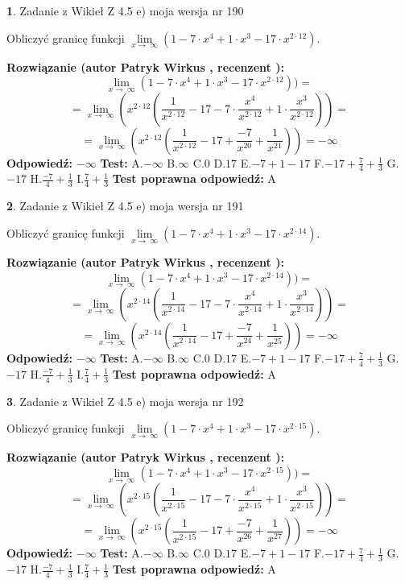 \documentclass[12pt, a4paper]{article}
\theoremstyle{definition} %
\newtheorem{zad}{}
\newcommand{\zadStart}[1]{\begin{zad}#1\newline}
\newcommand{\zadStop}{\end{zad}}
\newcommand{\rozwStart}[2]{\noindent \textbf{Rozwiązanie (autor #1 , recenzent #2): }\newline}
\newcommand{\rozwStop}{\newline}
\newcommand{\odpStart}{\noindent \textbf{Odpowiedź:}\newline}
\newcommand{\odpStop}{\newline}
\newcommand{\testStart}{\noindent \textbf{Test:}\newline}
\newcommand{\testStop}{\newline}
\newcommand{\kluczStart}{\noindent \textbf{Test poprawna odpowiedź:}\newline}
\newcommand{\kluczStop}{\newline}
\begin{document}
\zadStart{Zadanie z Wikieł Z 4.5 e) moja wersja nr 190}



Obliczyć granicę funkcji  $\lim\limits_{x\to\ \infty}(1 - 7 \cdot x^{4}+1 \cdot x^{3}- 17 \cdot x^{2\cdot12})$.
\zadStop
\rozwStart{Patryk Wirkus}{}
$$\lim\limits_{x\to\ \infty}(1 - 7 \cdot x^{4}+1 \cdot x^{3}- 17 \cdot x^{2\cdot12}))=$$
$$=\lim\limits_{x\to\ \infty}(x^{2\cdot12}(\frac{1}{x^{2\cdot12}}-17 -7 \cdot \frac{x^{4}}{x^{2\cdot12}}+1 \cdot \frac{x^{3}}{x^{2\cdot12}}))=$$
$$=\lim\limits_{x\to\ \infty}(x^{2\cdot12}(\frac{1}{x^{2\cdot12}}-17 + \frac{-7}{x^{20}}+ \frac{1}{x^{21}}))=-\infty$$
\rozwStop
\odpStart
$-\infty$
\odpStop
\testStart
A.$-\infty$ B.$\infty$ C.$0$ D.$17$ E.$-7 + 1 - 17$
F.$-17+\frac{7}{4}+\frac{1}{3}$ G.$-17$
H.$\frac{-7}{4}+\frac{1}{3}$
I.$\frac{7}{4}+\frac{1}{3}$
\testStop
\kluczStart
A
\kluczStop



\zadStart{Zadanie z Wikieł Z 4.5 e) moja wersja nr 191}



Obliczyć granicę funkcji  $\lim\limits_{x\to\ \infty}(1 - 7 \cdot x^{4}+1 \cdot x^{3}- 17 \cdot x^{2\cdot14})$.
\zadStop
\rozwStart{Patryk Wirkus}{}
$$\lim\limits_{x\to\ \infty}(1 - 7 \cdot x^{4}+1 \cdot x^{3}- 17 \cdot x^{2\cdot14}))=$$
$$=\lim\limits_{x\to\ \infty}(x^{2\cdot14}(\frac{1}{x^{2\cdot14}}-17 -7 \cdot \frac{x^{4}}{x^{2\cdot14}}+1 \cdot \frac{x^{3}}{x^{2\cdot14}}))=$$
$$=\lim\limits_{x\to\ \infty}(x^{2\cdot14}(\frac{1}{x^{2\cdot14}}-17 + \frac{-7}{x^{24}}+ \frac{1}{x^{25}}))=-\infty$$
\rozwStop
\odpStart
$-\infty$
\odpStop
\testStart
A.$-\infty$ B.$\infty$ C.$0$ D.$17$ E.$-7 + 1 - 17$
F.$-17+\frac{7}{4}+\frac{1}{3}$ G.$-17$
H.$\frac{-7}{4}+\frac{1}{3}$
I.$\frac{7}{4}+\frac{1}{3}$
\testStop
\kluczStart
A
\kluczStop



\zadStart{Zadanie z Wikieł Z 4.5 e) moja wersja nr 192}



Obliczyć granicę funkcji  $\lim\limits_{x\to\ \infty}(1 - 7 \cdot x^{4}+1 \cdot x^{3}- 17 \cdot x^{2\cdot15})$.
\zadStop
\rozwStart{Patryk Wirkus}{}
$$\lim\limits_{x\to\ \infty}(1 - 7 \cdot x^{4}+1 \cdot x^{3}- 17 \cdot x^{2\cdot15}))=$$
$$=\lim\limits_{x\to\ \infty}(x^{2\cdot15}(\frac{1}{x^{2\cdot15}}-17 -7 \cdot \frac{x^{4}}{x^{2\cdot15}}+1 \cdot \frac{x^{3}}{x^{2\cdot15}}))=$$
$$=\lim\limits_{x\to\ \infty}(x^{2\cdot15}(\frac{1}{x^{2\cdot15}}-17 + \frac{-7}{x^{26}}+ \frac{1}{x^{27}}))=-\infty$$
\rozwStop
\odpStart
$-\infty$
\odpStop
\testStart
A.$-\infty$ B.$\infty$ C.$0$ D.$17$ E.$-7 + 1 - 17$
F.$-17+\frac{7}{4}+\frac{1}{3}$ G.$-17$
H.$\frac{-7}{4}+\frac{1}{3}$
I.$\frac{7}{4}+\frac{1}{3}$
\testStop
\kluczStart
A
\kluczStop
\end{document}
